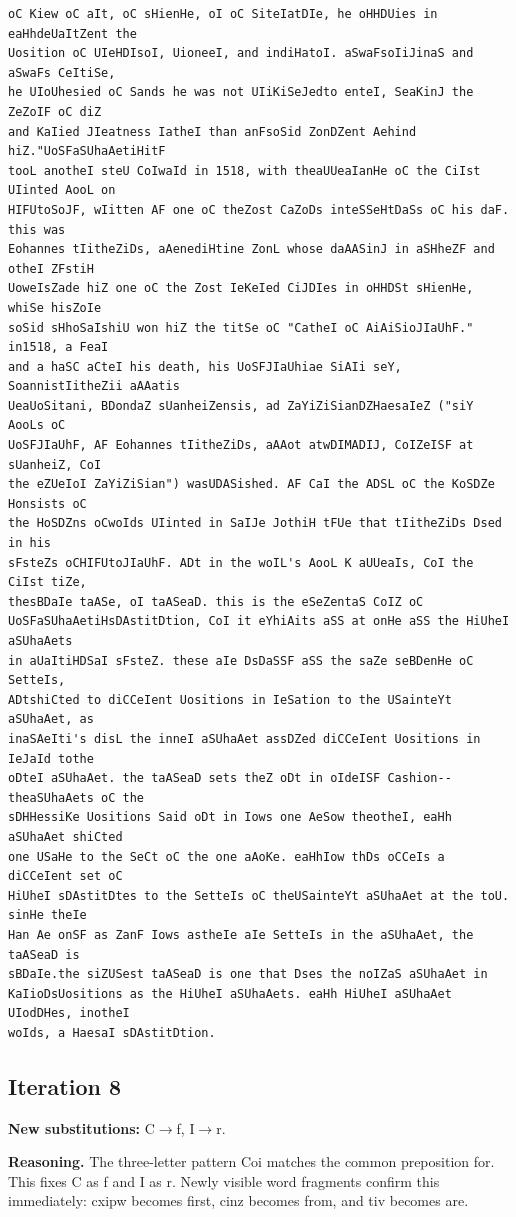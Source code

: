 \documentclass[12pt,a4paper]{article}
\begin{document}
\begin{lstlisting}[caption={Complete text after iteration 7}, label={lst:iter7}]
oC Kiew oC aIt, oC sHienHe, oI oC SiteIatDIe, he oHHDUies in eaHhdeUaItZent the
Uosition oC UIeHDIsoI, UioneeI, and indiHatoI. aSwaFsoIiJinaS and aSwaFs CeItiSe,
he UIoUhesied oC Sands he was not UIiKiSeJedto enteI, SeaKinJ the ZeZoIF oC diZ
and KaIied JIeatness IatheI than anFsoSid ZonDZent Aehind hiZ."UoSFaSUhaAetiHitF
tooL anotheI steU CoIwaId in 1518, with theaUUeaIanHe oC the CiIst UIinted AooL on
HIFUtoSoJF, wIitten AF one oC theZost CaZoDs inteSSeHtDaSs oC his daF. this was
Eohannes tIitheZiDs, aAenediHtine ZonL whose daAASinJ in aSHheZF and otheI ZFstiH
UoweIsZade hiZ one oC the Zost IeKeIed CiJDIes in oHHDSt sHienHe, whiSe hisZoIe
soSid sHhoSaIshiU won hiZ the titSe oC "CatheI oC AiAiSioJIaUhF." in1518, a FeaI
and a haSC aCteI his death, his UoSFJIaUhiae SiAIi seY, SoannistIitheZii aAAatis
UeaUoSitani, BDondaZ sUanheiZensis, ad ZaYiZiSianDZHaesaIeZ ("siY AooLs oC
UoSFJIaUhF, AF Eohannes tIitheZiDs, aAAot atwDIMADIJ, CoIZeISF at sUanheiZ, CoI
the eZUeIoI ZaYiZiSian") wasUDASished. AF CaI the ADSL oC the KoSDZe Honsists oC
the HoSDZns oCwoIds UIinted in SaIJe JothiH tFUe that tIitheZiDs Dsed in his
sFsteZs oCHIFUtoJIaUhF. ADt in the woIL's AooL K aUUeaIs, CoI the CiIst tiZe,
thesBDaIe taASe, oI taASeaD. this is the eSeZentaS CoIZ oC
UoSFaSUhaAetiHsDAstitDtion, CoI it eYhiAits aSS at onHe aSS the HiUheI aSUhaAets
in aUaItiHDSaI sFsteZ. these aIe DsDaSSF aSS the saZe seBDenHe oC SetteIs,
ADtshiCted to diCCeIent Uositions in IeSation to the USainteYt aSUhaAet, as
inaSAeIti's disL the inneI aSUhaAet assDZed diCCeIent Uositions in IeJaId tothe
oDteI aSUhaAet. the taASeaD sets theZ oDt in oIdeISF Cashion--theaSUhaAets oC the
sDHHessiKe Uositions Said oDt in Iows one AeSow theotheI, eaHh aSUhaAet shiCted
one USaHe to the SeCt oC the one aAoKe. eaHhIow thDs oCCeIs a diCCeIent set oC
HiUheI sDAstitDtes to the SetteIs oC theUSainteYt aSUhaAet at the toU. sinHe theIe
Han Ae onSF as ZanF Iows astheIe aIe SetteIs in the aSUhaAet, the taASeaD is
sBDaIe.the siZUSest taASeaD is one that Dses the noIZaS aSUhaAet in
KaIioDsUositions as the HiUheI aSUhaAets. eaHh HiUheI aSUhaAet UIodDHes, inotheI
woIds, a HaesaI sDAstitDtion.
\end{lstlisting}

\clearpage
\subsection{Iteration 8}
\textbf{New substitutions:} C$\to$f, I$\to$r.

\textbf{Reasoning.} The three-letter pattern Coi matches the common preposition for. This fixes C as f and I as r. Newly visible word fragments confirm this immediately: cxipw becomes first, cinz becomes from, and tiv becomes are.
\end{document}
